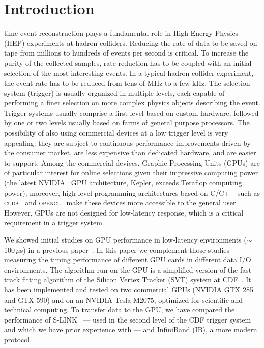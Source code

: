 \documentclass[journal]{IEEEtran}
\begin{document}
\section{Introduction}
 time event reconstruction plays a fundamental
role in High Energy Physics (HEP) experiments at hadron colliders.
Reducing the rate of data to be saved on tape from millions to
hundreds of events per second is critical. To increase the purity of
the collected samples, rate reduction has to be coupled with an initial
selection of the most interesting events.  In a typical hadron collider experiment, the
event rate has to be reduced from tens of MHz to a few kHz.  The selection system
(trigger) is usually organized in multiple levels, each capable of
performing a finer selection on more complex physics objects
describing the event. Trigger 
systems usually comprise a first level based on custom hardware,
followed by one or two levels usually based on farms of general
purpose processors.  The possibility of also using commercial devices
at a low trigger level is very appealing: they are subject
to continuous performance improvements driven by the consumer market, are
less expensive than dedicated hardware, and are easier to support.  Among
the commercial devices, Graphic Processing Units (GPUs) are of
particular interest for online selections given their impressive
computing power (the latest NVIDIA~\cite{bib_nvidia} GPU architecture,
Kepler, exceeds Teraflop computing power); moreover, high-level
programming architectures based on C/C++ such as
\textsc{cuda}~\cite{bib_cuda} and \textsc{opencl}~\cite{bib_OpenCL}
make these devices more accessible to the general user.  However, GPUs
are not designed for low-latency response, which is a critical
requirement in a trigger system.

We showed initial studies on GPU performance in low-latency
environments ($\sim$100\,$\mu$s) in a previous
paper~\cite{bib_GPU_TIPP2011}.  In this paper we complement those
studies measuring the timing performance of different GPU cards in
different data I/O environments. The algorithm run on the GPU is a
simplified version of the fast track fitting algorithm of the Silicon
Vertex Tracker (SVT) system at CDF~\cite{bib_SVT1}. It has been implemented
and tested on two commercial GPUs (NVIDIA GTX 285 and GTX 590) and on an
NVIDIA Tesla M2075, optimized for scientific and technical
computing. To transfer data to the GPU, we have compared the
performance of S-LINK~\cite{bib_slink} --- 
used in the second level of the CDF trigger system and which we have prior experience with --- and InfiniBand (IB), a more modern protocol.
\end{document}
